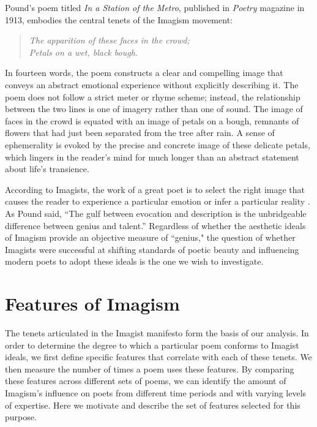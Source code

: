 \documentclass{book}
\begin{document}
Pound's poem titled \emph{In a Station of the Metro}, published in \emph{Poetry} magazine in 1913, embodies the central tenets of the Imagism movement:

\begin{verse}
\emph{The apparition of these faces in the crowd;\\
Petals on a wet, black bough.}
\end{verse}

In fourteen words, the poem constructs a clear and compelling image that conveys an abstract emotional experience without explicitly describing it. The poem does not follow a strict meter or rhyme scheme; instead, the relationship between the two lines is one of imagery rather than one of sound. The image of faces in the crowd is equated with an image of petals on a bough, remnants of flowers that had just been separated from the tree after rain. A sense of ephemerality is evoked by the precise and concrete image of these delicate petals, which lingers in the reader's mind for much longer than an abstract statement about life's transience. 

According to Imagists, the work of a great poet is to select the right image that causes the reader to experience a particular emotion or infer a particular reality \citep{hamilton2004toward}. As Pound said, 
``The gulf between evocation and description is the unbridgeable difference between genius and talent.'' Regardless of whether the aesthetic ideals of Imagism provide an objective measure of ``genius," the question of whether Imagists were successful at shifting standards of poetic beauty and influencing modern poets to adopt these ideals is the one we wish to investigate.


\section{Features of Imagism}
The tenets articulated in the Imagist manifesto form the basis of our analysis. In order to determine the degree to which a particular poem conforms to Imagist ideals, we first define specific features that correlate with each of these tenets. We then measure the number of times a poem uses these features. By comparing these features across different sets of poems, we can identify the amount of Imagism's influence on poets from different time periods and with varying levels of expertise. Here we motivate and describe the set of features selected for this purpose.
\end{document}
